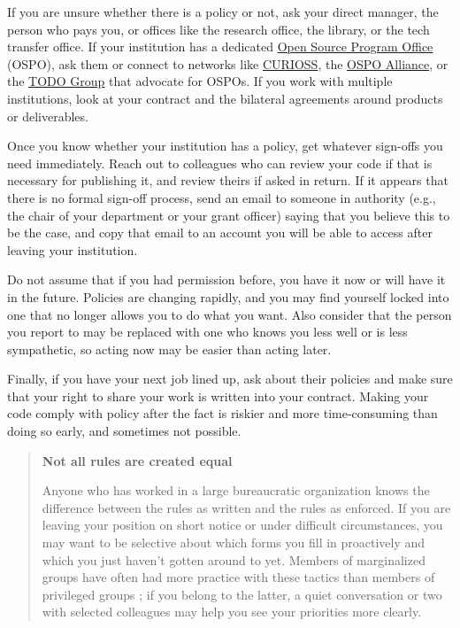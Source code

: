 \documentclass[10pt,letterpaper]{article}
\begin{document}
If you are unsure whether there is a policy or not,
ask your direct manager,
the person who pays you,
or offices like the research office,
the library,
or the tech transfer office.
If your institution has a dedicated
\href{https://sustainoss.org/academic-map/universities/index.html}{Open Source Program Office} (OSPO),
ask them
or connect to networks like \href{https://curioss.org}{CURIOSS},
the \href{https://ospo-alliance.org/}{OSPO Alliance},
or the \href{https://todogroup.org/}{TODO Group}
that advocate for OSPOs.
If you work with multiple institutions,
look at your contract and the bilateral agreements around products or deliverables.

Once you know whether your institution has a policy,
get whatever sign-offs you need immediately.
Reach out to colleagues who can review your code if that is necessary for publishing it,
and review theirs if asked in return.
If it appears that there is no formal sign-off process,
send an email to someone in authority
(e.g., the chair of your department or your grant officer)
saying that you believe this to be the case,
and copy that email to an account you will be able to access
after leaving your institution.

Do not assume that if you had permission before,
you have it now or will have it in the future.
Policies are changing rapidly,
and you may find yourself locked into one that no longer allows you to do what you want.
Also consider that the person you report to may be replaced with one who knows you less well or is less sympathetic,
so acting now may be easier than acting later.

Finally,
if you have your next job lined up,
ask about their policies
and make sure that your right to share your work is written into your contract.
Making your code comply with policy after the fact is riskier and more time-consuming than doing so early,
and sometimes not possible.

\begin{quote}
  \noindent
  \textbf{Not all rules are created equal}

  Anyone who has worked in a large bureaucratic organization knows
  the difference between the rules as written and the rules as enforced.
  If you are leaving your position on short notice or under difficult circumstances,
  you may want to be selective about which forms you fill in proactively
  and which you just haven't gotten around to yet.
  Members of marginalized groups have often had more practice with these tactics
  than members of privileged groups \cite{Scott1987};
  if you belong to the latter,
  a quiet conversation or two with selected colleagues may help you see your priorities more clearly.
\end{quote}
\end{document}
